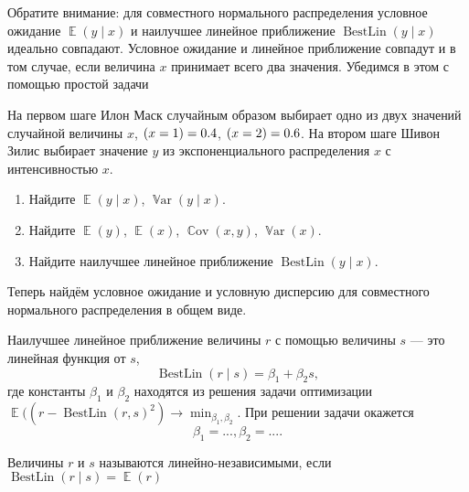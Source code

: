 \documentclass[12pt]{article}
\DeclareMathOperator{\Cov}{\mathbb{C}ov}
\DeclareMathOperator{\Var}{\mathbb{V}ar}
\DeclareMathOperator{\BestLin}{BestLin}
\let\P\relax
\DeclareMathOperator{\P}{\mathbb{P}}
\DeclareMathOperator{\E}{\mathbb{E}}
\newenvironment{sol}{}{}
\begin{document}
Обратите внимание: для совместного нормального распределения условное ожидание $\E(y \mid x)$ и наилучшее линейное приближение $\BestLin(y \mid x)$ идеально совпадают. 
Условное ожидание и линейное приближение совпадут и в том случае, если величина $x$ принимает всего два значения.
Убедимся в этом с помощью простой задачи

\begin{problem}
    На первом шаге Илон Маск случайным образом выбирает одно из двух значений случайной величины $x$, $\P(x = 1) = 0.4$, $\P(x = 2) = 0.6$.
    На втором шаге Шивон Зилис выбирает значение $y$ из экспоненциального распределения $x$ с интенсивностью $x$.

\begin{enumerate}
    \item Найдите $\E(y \mid x)$, $\Var(y \mid x)$.
    \item Найдите $\E(y)$, $\E(x)$, $\Cov(x, y)$, $\Var(x)$.
    \item Найдите наилучшее линейное приближение $\BestLin(y \mid x)$.
\end{enumerate}

    \begin{sol}
    \end{sol}
\end{problem}


Теперь найдём условное ожидание и условную дисперсию для совместного нормального распределения в общем виде. 



\begin{definition}
Наилучшее линейное приближение величины $r$ с помощью величины $s$ — это линейная функция от $s$,
\[
\BestLin(r \mid s) = \beta_1 + \beta_2 s,
\]
где константы $\beta_1$ и $\beta_2$ находятся из решения задачи оптимизации
$\E((r - \BestLin(r, s)^2) \to \min_{\beta_1, \beta_2}$.
При решении задачи окажется
\[
\beta_1 = ..., \beta_2 = ....
\]
\end{definition}

\begin{definition}
Величины $r$ и $s$ называются линейно-независимыми, если $\BestLin(r \mid s) = \E(r)$
\end{definition}
\end{document}
